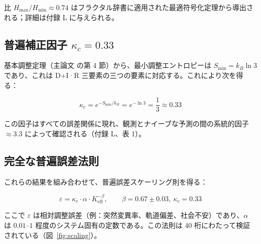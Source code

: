 \documentclass[12pt,a4paper]{article}
\newcommand{\Keff}{K_{\mathrm{eff}}}
\newcommand{\kappac}{\kappa_c}
\newcommand{\eps}{\varepsilon}
\theoremstyle{remark}
\begin{document}
	比 \(H_{\max}/H_{\min} \approx 0.74\) はフラクタル辞書に適用された最適符号化定理から導出される；詳細は付録 L \cite{AppendixL} に与えられる。
	
	\subsection{普遍補正因子 \(\kappac = 0.33\)}
	
	基本調整定理（主論文 \cite{Yakushev2026a} の第 4 節）から、最小調整エントロピーは \(S_{\min} = k_B \ln 3\) であり、これは D+I·R 三要素の三つの要素に対応する。これにより次を得る：
	
	\begin{equation}
		\kappac = e^{-S_{\min}/k_B} = e^{-\ln 3} = \frac{1}{3} \approx 0.33
		\label{eq:kappac-derivation}
	\end{equation}
	
	この因子はすべての誤差関係に現れ、観測とナイーブな予測の間の系統的因子 \(\approx 3.3\) によって確認される（付録 L、表 1）。
	
	\subsection{完全な普遍誤差法則}
	
	これらの結果を組み合わせて、普遍誤差スケーリング則を得る：
	
	\begin{equation}
		\boxed{\eps = \kappac \cdot \alpha \cdot \Keff^{-\beta}, \qquad \beta = 0.67 \pm 0.03, \ \kappac = 0.33}
		\label{eq:universal-error}
	\end{equation}
	
	ここで \(\eps\) は相対調整誤差（例：突然変異率、軌道偏差、社会不安）であり、\(\alpha\) は \(0.01\)--\(1\) 程度のシステム固有の定数である。この法則は 40 桁にわたって検証されている（図~\ref{fig:scaling}）。
	
\end{document}
